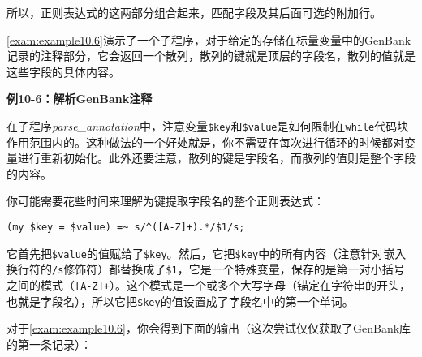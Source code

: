 所以，正则表达式的这两部分组合起来，匹配字段及其后面可选的附加行。

\autoref{exam:example10.6}演示了一个子程序，对于给定的存储在标量变量中的GenBank记录的注释部分，它会返回一个散列，散列的键就是顶层的字段名，散列的值就是这些字段的具体内容。

\textbf{例10-6：解析GenBank注释}


在子程序\textit{parse\_annotation}中，注意变量\verb|$key|和\verb|$value|是如何限制在\verb|while|代码块作用范围内的。这种做法的一个好处就是，你不需要在每次进行循环的时候都对变量进行重新初始化。此外还要注意，散列的键是字段名，而散列的值则是整个字段的内容。

你可能需要花些时间来理解为键提取字段名的整个正则表达式：

\begin{lstlisting}
(my $key = $value) =~ s/^([A-Z]+).*/$1/s;
\end{lstlisting}

它首先把\verb|$value|的值赋给了\verb|$key|。然后，它把\verb|$key|中的所有内容（注意针对嵌入换行符的\verb|/s|修饰符）都替换成了\verb|$1|，它是一个特殊变量，保存的是第一对小括号之间的模式（\verb|[A-Z]+|）。这个模式是一个或多个大写字母（锚定在字符串的开头，也就是字段名），所以它把\verb|$key|的值设置成了字段名中的第一个单词。


对于\autoref{exam:example10.6}，你会得到下面的输出（这次尝试仅仅获取了GenBank库的第一条记录）：

